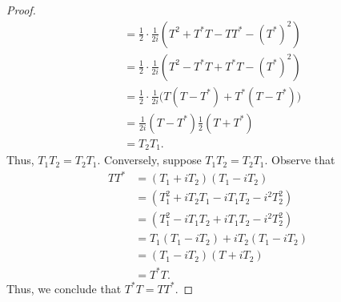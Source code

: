 \begin{enumerate}
\begin{proof}
\begin{align*}
                                                                                          &=  \frac{ 1 }{ 2 }  \cdot \frac{ 1 }{ 2i }  (T^{2} + T^{*}T - T T^{*} - (T^{*})^{2}) \\
                                                                                          &= \frac{ 1 }{ 2 }  \cdot \frac{ 1 }{ 2i } (T^{2} - T^{*} T + T^{*}T - (T^{*})^{2}) \\
                                                                                          &= \frac{ 1 }{ 2 }  \cdot \frac{ 1 }{ 2i }  \Big(  T (T  - T^{*}) + T^{*} (T - T^{*})  \Big) \\
                                                                                          &=  \frac{ 1 }{ 2i }  (T - T^{*}) \frac{ 1 }{ 2 }  (T + T^{*}) \\
                                                                                          &= {T}_{2} {T}_{1}.
        \end{align*}
        Thus, \( {T}_{1} {T}_{2} = {T}_{2} {T}_{1} \). Conversely, suppose \( {T}_{1} {T}_{2} = {T}_{2} {T}_{1} \). Observe that
        \begin{align*}
            T T^{*} &= ({T}_{1} + i {T}_{2})({T}_{1} - {iT}_{2}) \\
                    &= ({T}_{1}^{2} + i {T}_{2} {T}_{1} - i {T}_{1} {T}_{2} - i^{2} {T}_{2}^{2}) \\
                    &= ({T}_{1}^{2} - i {T}_{1} {T}_{2} + i {T}_{1} {T}_{2} - {i}^{2} T^{2}_2) \\
                    &= {T}_{1} ({T}_{1} - i {T}_{2}) +  i {T}_{2} ({T}_{1} - i {T}_{2}) \\
                    &= ({T}_{1} - i {T}_{2}) (T + i {T}_{2}) \\
                    &= T^{*} T.
         \end{align*}
         Thus, we conclude that \( T^{*} T = T T^{*} \).
        \end{proof}
\end{enumerate}


